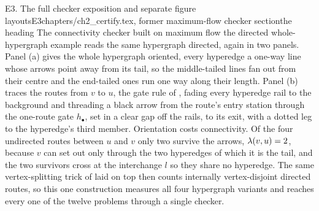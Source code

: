 \begin{offcut}{E3. The full checker exposition and separate figure layouts}{E3}{chapters/ch2\_certify.tex, former maximum-flow checker section}{the heading The connectivity checker built on maximum flow}
the directed whole-hypergraph example reads the same hypergraph directed, again in two panels. Panel (a) gives the whole hypergraph oriented, every hyperedge a one-way line whose arrows point away from its tail, so the middle-tailed lines fan out from their centre and the end-tailed ones run one way along their length. Panel (b) traces the routes from $v$ to $u$, the gate rule of , fading every hyperedge rail to the background and threading a black arrow from the route's entry station through the one-route gate $h_{\bullet}$, set in a clear gap off the rails, to its exit, with a dotted leg to the hyperedge's third member. Orientation costs connectivity. Of the four undirected routes between $u$ and $v$ only two survive the arrows, $\lambda(v, u) = 2$, because $v$ can set out only through the two hyperedges of which it is the tail, and the two survivors cross at the interchange $l$ so they share no hyperedge. The same vertex-splitting trick of  laid on top then counts internally vertex-disjoint directed routes, so this one construction measures all four hypergraph variants and  reaches every one of the twelve problems through a single checker.


\end{offcut}
